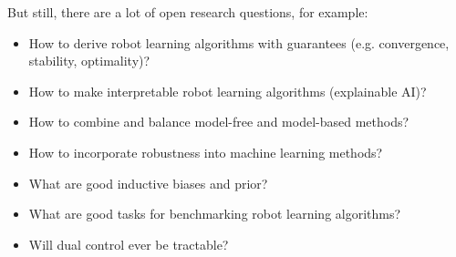 	But still, there are a lot of open research questions, for example:
	\begin{itemize}
		\item How to derive robot learning algorithms with guarantees (e.g. convergence, stability, optimality)?
		\item How to make interpretable robot learning algorithms (explainable AI)?
		\item How to combine and balance model-free and model-based methods?
		\item How to incorporate robustness into machine learning methods?
		\item What are good inductive biases and prior?
		\item What are good tasks for benchmarking robot learning algorithms?
		\item Will dual control ever be tractable?
	\end{itemize}
